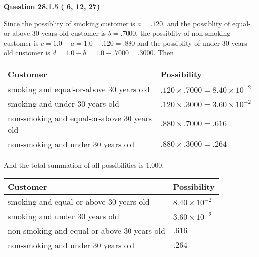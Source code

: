\documentclass[12pt]{article}
\begin{document}
 
 
  
\vspace{0.2in}
  
{\textbf{\Large{Question
28.1.5 
 (          6,         12,         27)
}}}
  
  
 
 
\noindent{}

Since the possiblity of  %
smoking customer is $ a =  %
.120 $,
and the possiblity of  %
equal-or-above 30 years old customer is $ b =  %
.7000 $,
the possiblity of  %
non-smoking customer is $ c = 1.0 - a = 1.0 -
.120
=  %
.880 $ and the possiblity of  %
under 30 years old
customer is $ d = 1.0 - b = 1.0 -  %
.7000 =  %
.3000  $.
Then
 
\noindent
\begin{tabular}{|l|l|}
\hline
Customer & Possibility \\
\hline
smoking  and  %
equal-or-above 30 years old  &
  $ %
.120 \times  %
.7000 =  %
8.40 \times 10^{-2}$ \\
\hline
smoking  and  %
under 30 years old &
  $ %
.120 \times  %
.3000 =  %
3.60 \times 10^{-2}$ \\
\hline
 non-smoking and  %
equal-or-above 30 years old  &
  $ %
.880 \times  %
.7000 =  %
.616$ \\
\hline
 non-smoking and  %
under 30 years old &
  $ %
.880 \times  %
.3000 =  %
.264$ \\
\hline
\end{tabular}
 
\noindent
And the total summation of all possibilities is $  %
1.000 $.
 
 
 
 
 
 
\noindent{}

 
\noindent
\begin{tabular}{|l|l|}
\hline
Customer & Possibility \\
\hline
smoking  and  %
equal-or-above 30 years old &
  $ %
8.40 \times 10^{-2}$ \\
\hline
smoking  and  %
under 30 years old &
  $ %
3.60 \times 10^{-2}$ \\
\hline
 non-smoking and  %
equal-or-above 30 years old &
  $ %
.616$ \\
\hline
 non-smoking and  %
under 30 years old &
  $ %
.264$ \\
\hline
\end{tabular}
 
\end{document}
